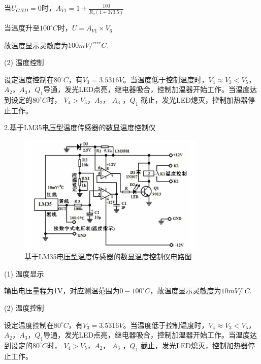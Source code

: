 \documentclass[12pt,a4paper,UTF8]{ctexart}
\begin{document}
当$U_{GND}=0$时，$A_{V1}=1+\frac{100}{R_0(1+373.5)}$

当温度升至$100^{\circ}C$时，$U=A_{V1}\times V_6$

故温度显示灵敏度为$100mV/^{circ}C$.

(2) 温度控制

设定温度控制在$80^{\circ}C$，有$V_3=3.5316V$。当温度低于控制温度时，$V_4\approx V_3 < V_5$，
$A_2 $，$A_3$，$Q_1$导通，发光LED点亮，继电器吸合，控制加温器开始工作。当温度达到设定的$80^{\circ}C$时，
$V_4> V_5$，$A_2 $， $A_3$ ，$Q_1$ 截止，发光LED熄灭，控制加热器停止工作。

2.基于LM35电压型温度传感器的数显温度控制仪

\begin{figure}[htbp]
	\centering
	\includegraphics[width=0.8\textwidth]{img//2.jpg}
	\caption{基于LM35电压型温度传感器的数显温度控制仪电路图}
\end{figure}

(1) 温度显示

输出电压量程为1V，对应测温范围为$0-100^{\circ}C$，故温度显示灵敏度为$10mV/^{\circ}C$.

(2) 温度控制

设定温度控制在$80^{\circ}C$，有$V_3=3.5316V$。当温度低于控制温度时，$V_4\approx V_3 < V_5$，
$A_2 $，$A_3$，$Q_1$导通，发光LED点亮，继电器吸合，控制加温器开始工作。当温度达到设定的$80^{\circ}C$时，
$V_4> V_5$，$A_2 $， $A_3$ ，$Q_1$ 截止，发光LED熄灭，控制加热器停止工作。
\end{document}
